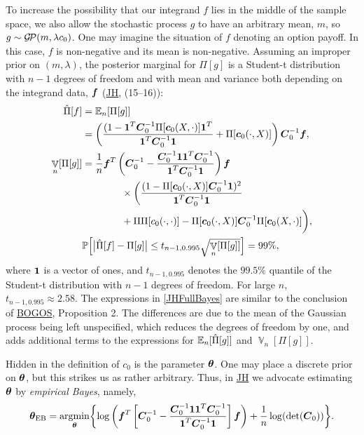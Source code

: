 \documentclass[sts]{imsart}
\numberwithin{equation}{section}
\theoremstyle{plain}
\newcommand{\vC}{\boldsymbol{C}}
\newcommand{\calGP}{\cg\!\cp}
\DeclareMathOperator{\Var}{\mathbb{V}}
\newcommand{\BOGOS}{\hyperlink{BriEtal18a}{BOGOS}\xspace}
\newcommand{\JH}{\hyperlink{RatHic18a}{JH}\xspace}
\begin{document}
To increase the possibility that our integrand $f$ lies in the middle of the sample space, we also allow the stochastic process $g$ to have an arbitrary mean, $m$, so $g \sim \calGP(m, \lambda c_0)$.  One may imagine the situation of $f$ denoting an option payoff.  In this case, $f$ is non-negative and its mean is non-negative.  Assuming an improper prior on $(m, \lambda)$, the posterior marginal for $\Pi[g]$ is  a Student-t distribution with $n-1$ degrees of freedom and with mean and variance both depending on the integrand data, $\boldsymbol{f}$ (\JH, (15--16)):
\begin{subequations} \label{JHFullBayes}
\begin{align}
\label{eqn:BC}
    \hat{\Pi}[f] & =  \Ex_n[\Pi[g]] \\
    \nonumber
    & =
\left(
\frac{  (1 - \vone^T  \vC^{-1}_0\Pi[\vc_0(X,\cdot) ] \vone^T }{ \vone^T  \vC^{-1}_0 \vone}   +  \Pi[\vc_0(\cdot, X)]
\right)  \vC^{-1}_0 \vf, \\
\label{eqn:errMLE}
\Var_n[\Pi[g]] & = \frac{1}{n}
 \vf^T \left(  \vC^{-1}_0 - 
\frac{  \vC^{-1}_0 \vone \vone^T  \vC^{-1}_0 }{\vone^T  \vC^{-1}_0 \vone}
\right) \vf \\
\nonumber
&\qquad \qquad \times
\left (
\frac{(1 - \Pi[\vc_0(\cdot, X)]\vC_0^{-1} \vone)^2}{\vone^T  \vC^{-1}_0 \vone} \right . \\
\nonumber & \qquad \qquad  +
\Pi\Pi[c_0(\cdot,\cdot)] - \Pi[\vc_0(\cdot, X)]\vC_0^{-1} \Pi[\vc_0(X,\cdot)] 
\biggr ), \\
\label{BCFullStop}
\lefteqn{\Prob\Bigl[\bigl \lvert \hat{\Pi}[f] - \Pi[g] \bigr \rvert \le t_{n-1,0.995} \sqrt{\Var_n[\Pi[g]]}  \Bigr] = 99\%,}
\end{align}
\end{subequations}
where $\boldsymbol{1}$ is a vector of ones, and $t_{n-1,0.995}$ denotes the $99.5\%$ quantile of the Student-t distribution with $n-1$ degrees of freedom.  For large $n$, $t_{n-1,0.995} \approx 2.58$.  The expressions in \eqref{JHFullBayes} are similar to the conclusion of \BOGOS, Proposition 2.  The differences are due to the mean of the Gaussian process being left unspecified, which reduces the degrees of freedom by one, and adds additional terms to the expressions for $\operatorname{\mathbb{E}}_n[\hat{\Pi}[g]]$ and $\Var_n[\Pi[g]]$.

Hidden in the definition of $c_0$ is the parameter $\boldsymbol{\theta}$. One may place a discrete prior on $\boldsymbol{\theta}$, but this strikes us as rather arbitrary.  Thus, in \JH we advocate estimating $\boldsymbol{\theta}$ by \emph{empirical Bayes}, namely,
\begin{equation} \label{thetaEB}
    \vtheta_{\textup{EB}}
= \argmin_{\vtheta} \biggl \{
\log\left(\vf^T 
\left[ \vC_0^{-1} - 
\frac{ \vC_0^{-1} \vone \vone^T \vC_0^{-1} }{\vone^T \vC_0^{-1} \vone}
\right] \vf 
\right) +  \frac{1}{n} \log(\det(\vC_0))
\biggr \}.
\end{equation}  
\end{document}

